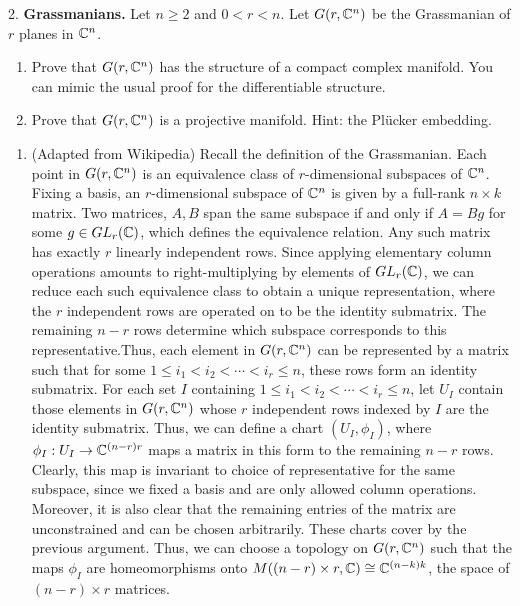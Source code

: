 \documentclass[12pt]{article}
\begin{document}


\begin{problem}{2.}
    \textbf{Grassmanians.} Let $n \geq 2$ and $0 < r < n$. Let $G(r, \mathbb C^n)$ be the Grassmanian of $r$ planes in $\mathbb C^n$.
    \begin{enumerate}
        \item Prove that $G(r, \mathbb C^n)$ has the structure of a compact complex manifold. You can mimic the usual proof for the differentiable structure. 
        \item Prove that $G(r, \mathbb C^n)$ is a projective manifold. Hint: the Plücker embedding. 
    \end{enumerate}
\end{problem}

\begin{solution}
    \begin{enumerate}
        \item (Adapted from Wikipedia) Recall the definition of the Grassmanian. Each point in $G(r, \mathbb C^n)$ is an equivalence class of $r$-dimensional subspaces of $\mathbb C^n$. Fixing a basis, an $r$-dimensional subspace of $\mathbb C^n$ is given by a full-rank $n \times k$ matrix. Two matrices, $A, B$ span the same subspace if and only if $A = Bg$ for some $g \in GL_r(\mathbb C)$, which defines the equivalence relation. Any such matrix has exactly $r$ linearly independent rows. Since applying elementary column operations amounts to right-multiplying by elements of $GL_r(\mathbb C)$, we can reduce each such equivalence class to obtain a unique representation, where the $r$ independent rows are operated on to be the identity submatrix. The remaining $n-r$ rows determine which subspace corresponds to this representative.\bbni Thus, each element in $G(r, \mathbb C^n)$ can be represented by a matrix such that for some $1 \leq i_1 < i_2 < \cdots < i_r \leq n$, these rows form an identity submatrix. For each set $I$ containing $1 \leq i_1 < i_2 < \cdots < i_r \leq n$, let $U_I$ contain those elements in $G(r, \mathbb C^n)$ whose $r$ independent rows indexed by $I$ are the identity submatrix. Thus, we can define a chart $(U_I, \phi_I)$, where $\phi_I: U_I \to \mathbb C^{(n-r)r}$ maps a matrix in this form to the remaining $n-r$ rows. Clearly, this map is invariant to choice of representative for the same subspace, since we fixed a basis and are only allowed column operations. Moreover, it is also clear that the remaining entries of the matrix are unconstrained and can be chosen arbitrarily. These charts cover by the previous argument. \bbni 
        Thus, we can choose a topology on $G(r, \mathbb C^n)$ such that the maps $\phi_I$ are homeomorphisms onto $M((n-r) \times r, \mathbb C) \cong \mathbb C^{(n-k)k}$, the space of $(n-r)\times r$ matrices. \bbni

\end{enumerate}
\end{solution}
\end{document}
